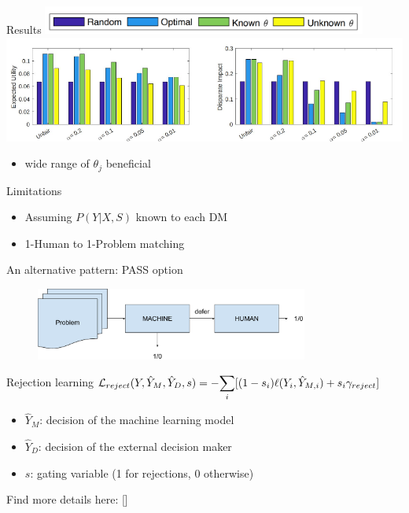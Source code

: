 \documentclass[11pt]{beamer}
\begin{document}
\begin{frame}{Results}
\centering
\includegraphics[width=0.8\textwidth]{Figures/paper2_results1.png}
\newline
\centering
\includegraphics[width=1\textwidth]{Figures/paper2_results2.pdf}
\newline
\begin{itemize}
    \item wide range of $\theta_j$ beneficial
\end{itemize}
Limitations
\begin{itemize}
\item Assuming $P(Y|X,S)$ known to each DM
\item 1-Human to 1-Problem matching
\end{itemize}
\end{frame}

\begin{frame}{An alternative pattern: PASS option}
\begin{figure}[t!]
	\centering
	\includegraphics[width=0.8\textwidth]{Figures/defer.pdf}
\end{figure}
\end{frame}

\begin{frame}{Rejection learning}
$ \mathcal{L}_{reject}(Y,\hat{Y}_M, \hat{Y}_D, s) = 
- \mathlarger{\sum}\limits_i [(1-s_i) \ell(Y_i, \hat{Y}_{M,i}) + s_i \gamma_{reject}] $
\begin{itemize}
    \item $\hat{Y}_M $: decision of the machine learning model
    \item $\hat{Y}_D $: decision of the external decision maker
    \item $s$: gating variable (1 for rejections, 0 otherwise)
\end{itemize}
\vspace{60pt}
{\footnotesize Find more details here: [\cite{cortes2016learning}]}
\end{frame}
\end{document}
